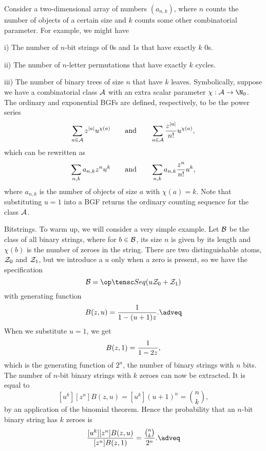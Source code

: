 Consider a two-dimensional array of numbers $(a_{n,k})$, where $n$ counts the number of objects
of a certain size and $k$ counts some other combinatorial parameter. For example, we might have
\medskip
\item{i)} The number of $n$-bit strings of 0s and 1s that have exactly $k$ 0s.
\smallskip
\item{ii)} The number of $n$-letter permutations that have exactly $k$ cycles.
\smallskip
\item{iii)} The number of binary trees of size $n$ that have $k$ leaves.
\medskip
Symbolically, suppose we have a combinatorial class ${\cal A}$ with an extra scalar parameter $\chi : \A \to \N_0$.
The ordinary and exponential BGFs are defined, respectively, to be the power series
$$\sum_{a\in{\cal A}} z^{|a|} u^{\chi(a)} \qquad\hbox{and}\qquad
           \sum_{a\in{\cal A}} {z^{|a|}\over n!} u^{\chi(a)},$$
which can be rewritten as
$$\sum_{n,k} a_{n,k} z^n u^k \qquad\hbox{and}\qquad \sum_{n,k} a_{n,k} {z^n\over n!} u^k,$$
where $a_{n,k}$ is the number of objects of size $a$ with $\chi(a) = k$. Note that substituting $u=1$ into
a BGF returns the ordinary counting sequence for the class ${\cal A}$.
\medskip

\boldlabel Bitstrings. To warm up, we will consider a very simple example. Let ${\cal B}$ be the class of all
binary strings, where for $b\in {\cal B}$, its size $n$ is given by its length and $\chi(b)$ is the number
of zeroes in the string. There are two distinguishable atoms, ${\cal Z}_0$ and ${\cal Z}_1$, but we introduce a $u$
only when a zero is present, so we have the specification
$$\B = \Seq(u\Z_0 + \Z_1)$$
with generating function
$$B(z,u) = {1\over 1-(u+1)z}.\adveq$$
When we substitute $u=1$, we get
$$B(z,1) = {1\over 1-2z},$$
which is the generating function of $2^n$, the number of binary strings with $n$ bits.
The number of $n$-bit binary strings with $k$ zeroes can now be extracted. It is equal to
$$[u^k][z^n]B(z,u) = [u^k](u+1)^n = {n\choose k},$$
by an application of the binomial theorem.
Hence the probability that an $n$-bit binary string has $k$ zeroes is
$${[u^k][z^n] B(z,u) \over [z^n] B(z,1)} = {{n\choose k}\over 2^n}.\adveq$$
\medskip

